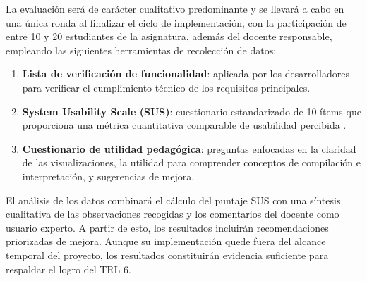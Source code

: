La evaluación será de carácter cualitativo predominante y se llevará a cabo en una única ronda al finalizar el ciclo de implementación, con la participación de entre 10 y 20 estudiantes de la asignatura, además del docente responsable, empleando las siguientes herramientas de recolección de datos:

\begin{enumerate}
    \item \textbf{Lista de verificación de funcionalidad}: aplicada por los desarrolladores para verificar el cumplimiento técnico de los requisitos principales.
    \item \textbf{System Usability Scale (SUS)}: cuestionario estandarizado de 10 ítems que proporciona una métrica cuantitativa comparable de usabilidad percibida \cite{blattgerste2022web}.
    \item \textbf{Cuestionario de utilidad pedagógica}: preguntas enfocadas en la claridad de las visualizaciones, la utilidad para comprender conceptos de compilación e interpretación, y sugerencias de mejora.
\end{enumerate}

El análisis de los datos combinará el cálculo del puntaje SUS con una síntesis cualitativa de las observaciones recogidas y los comentarios del docente como usuario experto. A partir de esto, los resultados incluirán recomendaciones priorizadas de mejora. Aunque su implementación quede fuera del alcance temporal del proyecto, los resultados constituirán evidencia suficiente para respaldar el logro del TRL 6.
